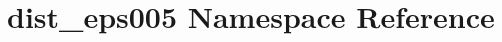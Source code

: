 \hypertarget{namespacedist__eps005}{}\section{dist\+\_\+eps005 Namespace Reference}
\label{namespacedist__eps005}
